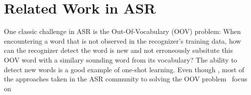 \section{Related Work in ASR}

One classic challenge in ASR is the Out-Of-Vocabulary (OOV) problem: When encountering a word that is not observed in the recognizer's training data, how can the recognizer detect the word is new and not erroneously subsitute this OOV word with a similary sounding word from its vocabulary? The ability to detect new words is a good example of one-shot learning. Even though , most of the approaches taken in the ASR community to solving the OOV problem~\cite{} focus on 
